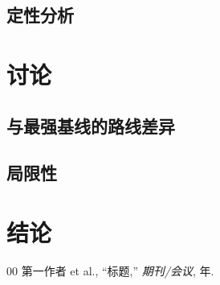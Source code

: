 \documentclass[conference]{IEEEtran}
\begin{document}
\subsection{定性分析}

\section{讨论}
\subsection{与最强基线的路线差异}
\subsection{局限性}

\section{结论}

\begin{thebibliography}{00}
 第一作者 et al., ``标题,'' \textit{期刊/会议}, 年.
\end{thebibliography}
\end{document}
